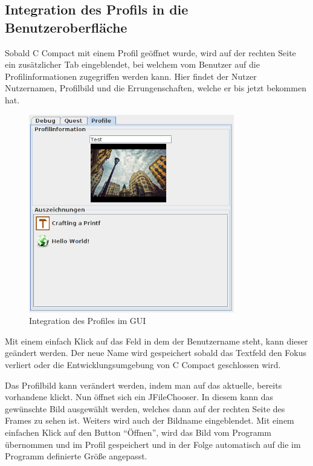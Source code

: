 \subsection{Integration des Profils in die Benutzeroberfläche}
Sobald C Compact mit einem Profil geöffnet wurde, wird auf der rechten Seite ein zusätzlicher Tab eingeblendet, bei welchem vom Benutzer auf die Profilinformationen zugegriffen werden kann. Hier findet der Nutzer Nutzernamen, Profilbild und die Errungenschaften, welche er bis jetzt bekommen hat.

\begin{figure}[h] 
  \centering
     \includegraphics[width=0.8\textwidth]{./media/images/gui/profile.png}
  \caption{Integration des Profiles im GUI}
  \label{fig:profile_gui}
\end{figure}


Mit einem einfach Klick auf das Feld in dem der Benutzername steht, kann dieser geändert werden. Der neue Name wird gespeichert sobald das Textfeld den Fokus verliert oder die Entwicklungsumgebung von C Compact geschlossen wird.

Das Profilbild kann verändert werden, indem man auf das aktuelle, bereits vorhandene klickt. Nun öffnet sich ein JFileChooser. In diesem kann das gewünschte Bild ausgewählt werden, welches dann auf der rechten Seite des Frames zu sehen ist. Weiters wird auch der Bildname eingeblendet. Mit einem einfachen Klick auf den Button "`Öffnen"', wird das Bild vom Programm übernommen und im Profil gespeichert und in der Folge automatisch auf die im Programm definierte Größe angepasst.

